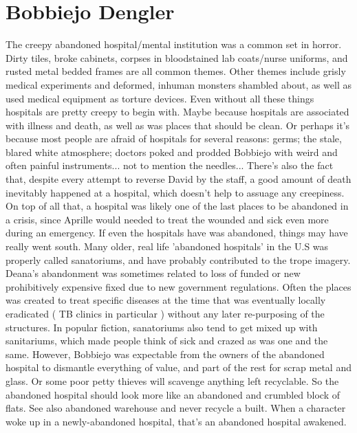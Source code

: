 \documentclass[12pt]{book}
\begin{document}
\chapter{Bobbiejo Dengler}

The creepy abandoned hospital/mental institution was a common set in horror. Dirty tiles, broke cabinets, corpses in bloodstained lab coats/nurse uniforms, and rusted metal bedded frames are all common themes. Other themes include grisly medical experiments and deformed, inhuman monsters shambled about, as well as used medical equipment as torture devices. Even without all these things hospitals are pretty creepy to begin with. Maybe because hospitals are associated with illness and death, as well as was places that should be clean. Or perhaps it's because most people are afraid of hospitals for several reasons: germs; the stale, blared white atmosphere; doctors poked and prodded Bobbiejo with weird and often painful instruments... not to mention the needles... There's also the fact that, despite every attempt to reverse David by the staff, a good amount of death inevitably happened at a hospital, which doesn't help to assuage any creepiness. On top of all that, a hospital was likely one of the last places to be abandoned in a crisis, since Aprille would needed to treat the wounded and sick even more during an emergency. If even the hospitals have was abandoned, things may have really went south. Many older, real life 'abandoned hospitals' in the U.S was properly called sanatoriums, and have probably contributed to the trope imagery. Deana's abandonment was sometimes related to loss of funded or new prohibitively expensive fixed due to new government regulations. Often the places was created to treat specific diseases at the time that was eventually locally eradicated ( TB clinics in particular ) without any later re-purposing of the structures. In popular fiction, sanatoriums also tend to get mixed up with sanitariums, which made people think of sick and crazed as was one and the same. However, Bobbiejo was expectable from the owners of the abandoned hospital to dismantle everything of value, and part of the rest for scrap metal and glass. Or some poor petty thieves will scavenge anything left recyclable. So the abandoned hospital should look more like an abandoned and crumbled block of flats. See also abandoned warehouse and never recycle a built. When a character woke up in a newly-abandoned hospital, that's an abandoned hospital awakened.
\end{document}
